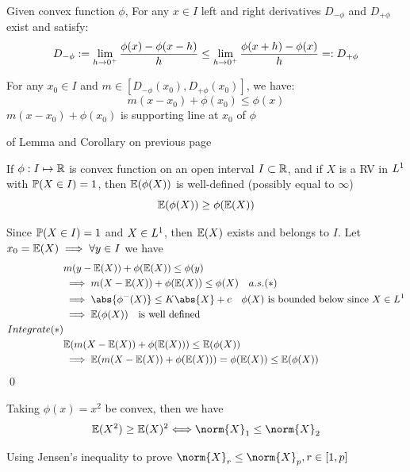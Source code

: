 \vspace{3cm}
\begin{cor}
Given convex function $\phi$, For any $x \in I$ left and right derivatives $D_{-\phi}$ and $D_{+\phi}$ exist and satisfy:
\begin{align*}
    D_{-\phi} := \lim\limits_{h\rightarrow 0^+} \frac{\phi(x) - \phi(x-h)}{h} \leq \lim\limits_{h\rightarrow 0^+} \frac{\phi(x+h) - \phi(x)}{h} =: D_{+\phi}
\end{align*}
\end{cor}
\vspace{3cm}
\begin{cor}
For any $x_0 \in I$ and $m\in [D_{-\phi}(x_0),D_{+\phi}(x_0)]$, we have:
\begin{equation*}
    m(x-x_0) + \phi(x_0) \leq \phi(x)
\end{equation*}$m(x-x_0) + \phi(x_0)$ is supporting line at $x_0$ of $\phi$
\end{cor}
\newpage
\pf of Lemma and Corollary on previous page
\newpage
\begin{thm}
\label{jensen}
If $\phi: I \mapsto \mathbb{R}$ is convex function on an open interval $I\subset \mathbb{R}$, and if $X$ is a RV in $L^{1}$ with $\mathbb{P}(X\in I)=1$, then $\mathbb{E}(\phi(X))$ is well-defined (possibly equal to $\infty$)
\begin{equation*}
    \mathbb{E}(\phi(X)) \geq \phi(\mathbb{E}(X))
\end{equation*}
\end{thm}

\pf Since $\mathbb{P}(X\in I)=1$ and $X\in L^{1}$, then $\mathbb{E}(X)$ exists and belongs to $I$. Let $x_0 = \mathbb{E}(X) \implies \forall y\in I$ we have \begin{align*}
    &m(y-\E(X))+\phi(\E(X)) \leq \phi(y) \\
    &\implies m(X-\E(X))+\phi(\E(X)) \leq \phi(X) \quad a.s. (*)\\
    &\implies \abs{\phi^-(X)} \leq K\abs{X} + c \quad \text{$\phi(X)$ is bounded below since $X \in \ls{1}$} \\
    &\implies \E(\phi(X)) \quad \text{is well defined} \\
    Integrate (*) \\
    &\E(m(X-\E(X))+\phi(\E(X))) \leq \E(\phi(X)) \\
    &\implies \E(m(X-\E(X))+\phi(\E(X))) = \phi(\E(X)) \leq \E(\phi(X))
\end{align*}\qed
\begin{rem}
Taking $\phi(x) = x^2$ be convex, then we have
\begin{equation*}
    \E(X^2) \geq \E(X)^2 \Longleftrightarrow \norm{X}_1 \leq \norm{X}_2
\end{equation*}
\end{rem}
\begin{ex}
Using Jensen's inequality to prove $\norm{X}_r \leq \norm{X}_p, r\in [1,p]$ 
\end{ex}
\newpage
